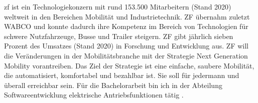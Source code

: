


\ac{zf} ist ein Technologiekonzern mit rund 153.500 Mitarbeitern (Stand 2020) weltweit in den Bereichen Mobilität
und Industrietechnik. ZF übernahm zuletzt WABCO und konnte dadurch ihre Kompetenz im Bereich von Technologien
für schwere Nutzfahrzeuge, Busse und Trailer steigern. ZF gibt jährlich sieben Prozent des Umsatzes (Stand 2020) in 
Forschung und Entwicklung aus. ZF will die Veränderungen in der Mobilitätsbranche 
mit der
Strategie \glqq Next Generation Mobility\grqq{} vorantreiben. Das Ziel der Strategie ist eine einfache, saubere
Mobilität, die automatisiert, komfortabel und bezahlbar ist. Sie soll für jedermann und überall erreichbar sein.
Für die Bachelorarbeit bin ich in der Abteilung Softwareentwicklung elektrische
Antriebsfunktionen tätig \cite[vgl.][]{zf}.

